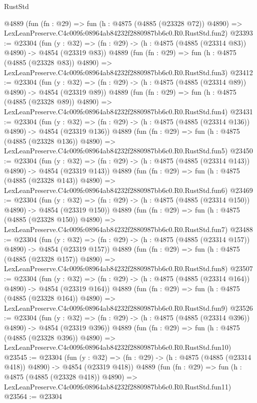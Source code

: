 \begin{lexlean}{RustStd}
\begin{coremodule}
    @4889
    (fun (fn : @29) =>
    fun (h : @4875 (@4885 (@23328 @72)) @4890) =>
    LexLeanPreserve.C4c009fc08964ab84232f2880987bb6c0.R0.RustStd.fun2)
@23393 := @23304
    (fun (y : @32) => (fn : @29) -> (h : @4875 (@4885 (@23314 @83)) @4890) -> @4854 (@23319 @83))
    @4889
    (fun (fn : @29) =>
    fun (h : @4875 (@4885 (@23328 @83)) @4890) =>
    LexLeanPreserve.C4c009fc08964ab84232f2880987bb6c0.R0.RustStd.fun3)
@23412 := @23304
    (fun (y : @32) => (fn : @29) -> (h : @4875 (@4885 (@23314 @89)) @4890) -> @4854 (@23319 @89))
    @4889
    (fun (fn : @29) =>
    fun (h : @4875 (@4885 (@23328 @89)) @4890) =>
    LexLeanPreserve.C4c009fc08964ab84232f2880987bb6c0.R0.RustStd.fun4)
@23431 := @23304
    (fun (y : @32) => (fn : @29) -> (h : @4875 (@4885 (@23314 @136)) @4890) -> @4854 (@23319 @136))
    @4889
    (fun (fn : @29) =>
    fun (h : @4875 (@4885 (@23328 @136)) @4890) =>
    LexLeanPreserve.C4c009fc08964ab84232f2880987bb6c0.R0.RustStd.fun5)
@23450 := @23304
    (fun (y : @32) => (fn : @29) -> (h : @4875 (@4885 (@23314 @143)) @4890) -> @4854 (@23319 @143))
    @4889
    (fun (fn : @29) =>
    fun (h : @4875 (@4885 (@23328 @143)) @4890) =>
    LexLeanPreserve.C4c009fc08964ab84232f2880987bb6c0.R0.RustStd.fun6)
@23469 := @23304
    (fun (y : @32) => (fn : @29) -> (h : @4875 (@4885 (@23314 @150)) @4890) -> @4854 (@23319 @150))
    @4889
    (fun (fn : @29) =>
    fun (h : @4875 (@4885 (@23328 @150)) @4890) =>
    LexLeanPreserve.C4c009fc08964ab84232f2880987bb6c0.R0.RustStd.fun7)
@23488 := @23304
    (fun (y : @32) => (fn : @29) -> (h : @4875 (@4885 (@23314 @157)) @4890) -> @4854 (@23319 @157))
    @4889
    (fun (fn : @29) =>
    fun (h : @4875 (@4885 (@23328 @157)) @4890) =>
    LexLeanPreserve.C4c009fc08964ab84232f2880987bb6c0.R0.RustStd.fun8)
@23507 := @23304
    (fun (y : @32) => (fn : @29) -> (h : @4875 (@4885 (@23314 @164)) @4890) -> @4854 (@23319 @164))
    @4889
    (fun (fn : @29) =>
    fun (h : @4875 (@4885 (@23328 @164)) @4890) =>
    LexLeanPreserve.C4c009fc08964ab84232f2880987bb6c0.R0.RustStd.fun9)
@23526 := @23304
    (fun (y : @32) => (fn : @29) -> (h : @4875 (@4885 (@23314 @396)) @4890) -> @4854 (@23319 @396))
    @4889
    (fun (fn : @29) =>
    fun (h : @4875 (@4885 (@23328 @396)) @4890) =>
    LexLeanPreserve.C4c009fc08964ab84232f2880987bb6c0.R0.RustStd.fun10)
@23545 := @23304
    (fun (y : @32) => (fn : @29) -> (h : @4875 (@4885 (@23314 @418)) @4890) -> @4854 (@23319 @418))
    @4889
    (fun (fn : @29) =>
    fun (h : @4875 (@4885 (@23328 @418)) @4890) =>
    LexLeanPreserve.C4c009fc08964ab84232f2880987bb6c0.R0.RustStd.fun11)
@23564 := @23304

\end{coremodule}
\end{lexlean}
